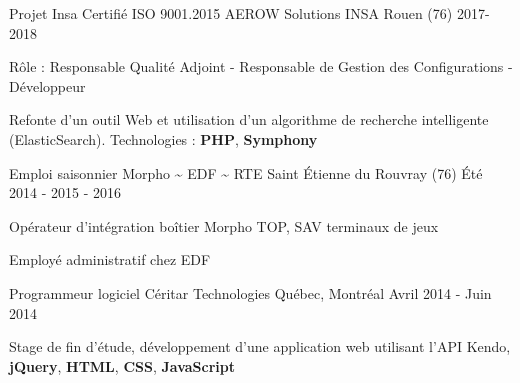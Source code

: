 

\begin{cventries}

  \cventry
	{Projet Insa Certifié ISO 9001.2015} %
	{AEROW Solutions} %
	{INSA Rouen (76)} %
	{2017-2018} %
	{
		\begin{cvitems} %
			\item {Rôle : Responsable Qualité Adjoint - Responsable de Gestion des Configurations - Développeur}
			\item {Refonte d'un outil Web et utilisation d'un algorithme de recherche intelligente (ElasticSearch). Technologies : \textbf{PHP}, \textbf{Symphony}}
		\end{cvitems}
	}
	
	
	\cventry
	{Emploi saisonnier} %
	{Morpho  \textasciitilde{}  EDF  \textasciitilde{}  RTE} %
	{Saint Étienne du Rouvray (76)} %
	{Été 2014 - 2015 - 2016} %
	{
		\begin{cvitems} %
			\item {Opérateur d'intégration boîtier Morpho TOP, SAV terminaux de jeux }
			\item {Employé administratif chez EDF}
		\end{cvitems}
	}


  \cventry
    {Programmeur logiciel} %
    {Céritar Technologies} %
    {Québec, Montréal} %
    {Avril 2014 - Juin 2014} %
    {
      \begin{cvitems} %
        \item {Stage de fin d'étude, développement d'une application web utilisant l'API Kendo, \textbf{jQuery}, \textbf{HTML}, \textbf{CSS}, \textbf{JavaScript}}
      \end{cvitems}
    }

\end{cventries}

